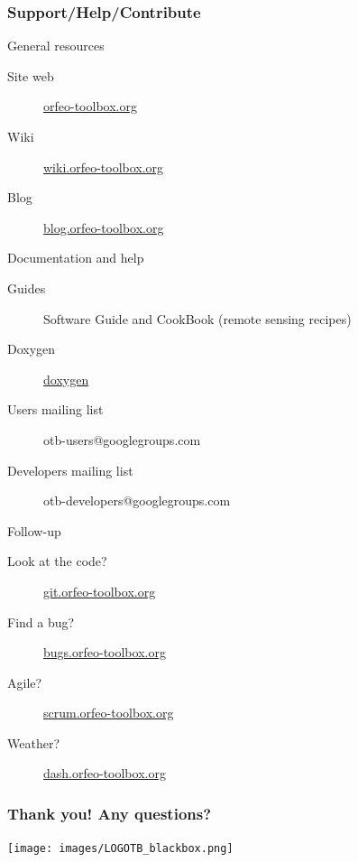 \documentclass[8pt]{beamer}
\begin{document}
\begin{frame}
\frametitle{Support/Help/Contribute}
\vspace{-0.2cm}
\begin{block}{General resources}
\vspace{-0.2cm}
\begin{description}
\item[Site web] \href{http://www.orfeo-toolbox.org}{orfeo-toolbox.org}
\item[Wiki] \href{http://wiki.orfeo-toolbox.org}{wiki.orfeo-toolbox.org}
\item[Blog] \href{http://blog.orfeo-toolbox.org}{blog.orfeo-toolbox.org}
\end{description}
\end{block}
\vspace{-0.2cm}
\begin{block}{Documentation and help}
\vspace{-0.2cm}
\begin{description}
\item[Guides] Software Guide and CookBook (remote sensing recipes)
\item[Doxygen] \href{http://www.orfeo-toolbox.org/doxygen}{doxygen}
\item[Users mailing list] otb-users@googlegroups.com
\item[Developers mailing list] otb-developers@googlegroups.com
\end{description}
\end{block}
\vspace{-0.2cm}
\begin{block}{Follow-up}
\vspace{-0.2cm}
\begin{description}
\item[Look at the code?] \href{http://git.orfeo-toolbox.org}{git.orfeo-toolbox.org}
\item[Find a bug?] \href{http://bugs.orfeo-toolbox.org}{bugs.orfeo-toolbox.org}
\item[Agile?] \href{http://scrum.orfeo-toolbox.org}{scrum.orfeo-toolbox.org}
\item[Weather?] \href{http://dash.orfeo-toolbox.org}{dash.orfeo-toolbox.org}
\end{description}
\end{block}
\end{frame}


\begin{frame}
\frametitle{Thank you! Any questions?}
\begin{minipage}[t][6cm][t]{\textwidth}
\begin{center}
\texttt{[image: images/LOGOTB\_blackbox.png]}
\end{center}
\end{minipage}
\end{frame}
\end{document}
